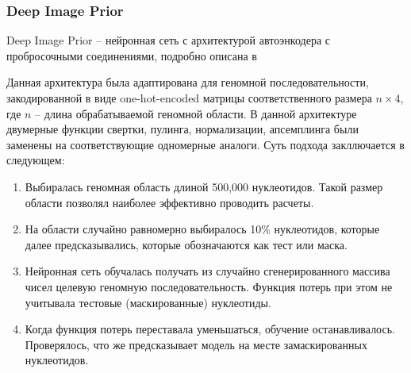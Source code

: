 \subsubsection{Deep Image Prior}
Deep Image Prior --  нейронная сеть с архитектурой автоэнкодера с пробросочными соединениями, подробно описана в \cite{ulyanov_deep_2018}

Данная архитектура была адаптирована для геномной последовательности, закодированной в виде one-hot-encoded матрицы соответственного размера $n\times 4$, где $n$ – длина обрабатываемой геномной области.
В данной архитектуре двумерные функции свертки, пулинга, нормализации, апсемплинга были заменены на соответствующие одномерные аналоги.
Суть подхода закллючается в следующем:

\begin{enumerate}[noitemsep,topsep=0pt]
	\item Выбиралась геномная область длиной 500,000 нуклеотидов. Такой размер области позволял наиболее эффективно проводить расчеты.
	\item На области случайно равномерно выбиралось  10\% нуклеотидов, которые далее предсказывались, которые обозначаются как тест или маска.
	\item Нейронная сеть обучалась получать из случайно сгенерированного массива чисел целевую геномную последовательность. Функция потерь при этом не учитывала тестовые (маскированные) нуклеотиды.
	\item Когда функция потерь переставала уменьшаться, обучение останавливалось. Проверялось, что же предсказывает модель на месте замаскированных нуклеотидов.
\end{enumerate} 




